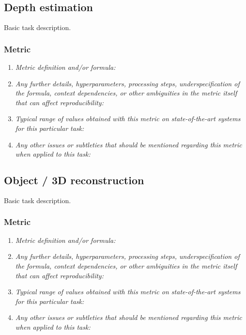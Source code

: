 \documentclass[a4paper,11pt]{article}
\begin{document}
\subsection{Depth estimation} \label{depth_estimation}
    Basic task description.
    \subsubsection{Metric}
        \begin{enumerate}[label=\alph*.]
            \item \textit{Metric definition and/or formula:}
            \bigskip
            \item \textit{Any further details, hyperparameters, processing steps, underspecification of the formula, context dependencies, or other ambiguities in the metric itself that can affect reproducibility:}
            \bigskip
            \item \textit{Typical range of values obtained with this metric on state-of-the-art systems for this particular task:}
            \bigskip
            \item \textit{Any other issues or subtleties that should be mentioned regarding this metric when applied to this task:}
            \bigskip
        \end{enumerate}

\subsection{Object / 3D reconstruction} \label{object_3d_reconstruction}
    Basic task description.
    \subsubsection{Metric}
        \begin{enumerate}[label=\alph*.]
            \item \textit{Metric definition and/or formula:}
            \bigskip
            \item \textit{Any further details, hyperparameters, processing steps, underspecification of the formula, context dependencies, or other ambiguities in the metric itself that can affect reproducibility:}
            \bigskip
            \item \textit{Typical range of values obtained with this metric on state-of-the-art systems for this particular task:}
            \bigskip
            \item \textit{Any other issues or subtleties that should be mentioned regarding this metric when applied to this task:}
            \bigskip
        \end{enumerate}
\end{document}
